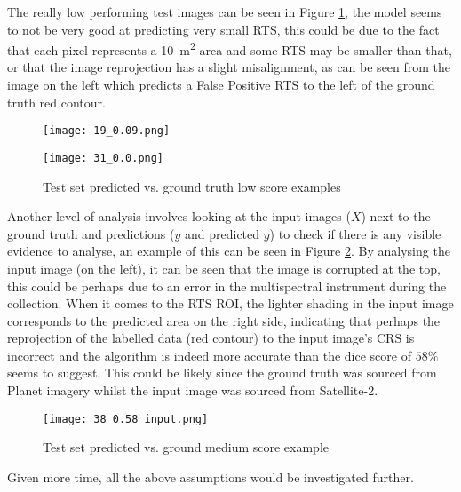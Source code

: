  The really low performing test images can be seen in Figure \ref{low_score_pic}, the model seems to not be very good at predicting very small \gls{RTS}, this could be due to the fact that each pixel represents a \SI{10}{\metre\squared} area and some \gls{RTS} may be smaller than that, or that the image reprojection has a slight misalignment, as can be seen from the image on the left which predicts a False Positive \gls{RTS} to the left of the ground truth red contour.
    \begin{figure}[htp]
        \begin{minipage}[c]{0.45\linewidth}
        \texttt{[image: 19\_0.09.png]}
        \end{minipage}
            \hfill
            \begin{minipage}[c]{0.45\linewidth}
            \texttt{[image: 31\_0.0.png]}
        \end{minipage}
        \caption{Test set predicted vs. ground truth low score examples} \label{low_score_pic}
    \end{figure}

Another level of analysis involves looking at the input images ($X$) next to the ground truth and predictions ($y$ and predicted $y$) to check if there is any visible evidence to analyse, an example of this can be seen in Figure \ref{medium_score_input_pic}. By analysing the input image (on the left), it can be seen that the image is corrupted at the top, this could be perhaps due to an error in the multispectral instrument during the collection. When it comes to the \gls{RTS} \gls{ROI}, the lighter shading in the input image corresponds to the predicted area on the right side, indicating that perhaps the reprojection of the labelled data (red contour) to the input image's \gls{CRS} is incorrect and the algorithm is indeed more accurate than the dice score of $58\%$ seems to suggest. This could be likely since the ground truth was sourced from Planet imagery whilst the input image was sourced from Satellite-2.
\begin{figure}[htp]
    \centering
    \texttt{[image: 38\_0.58\_input.png]}
    \caption{Test set predicted vs. ground medium score example}
    \label{medium_score_input_pic}
\end{figure}

Given more time, all the above assumptions would be investigated further.
